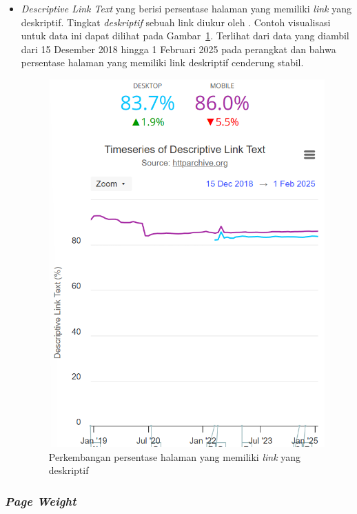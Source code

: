 \begin{itemize}
    \item \textit{Descriptive Link Text} yang berisi persentase halaman yang memiliki \textit{link} yang deskriptif. Tingkat \textit{deskriptif} sebuah link diukur oleh \light. Contoh visualisasi untuk data ini dapat dilihat pada Gambar~\ref{fig:disclink}. Terlihat dari data yang diambil dari 15 Desember 2018 hingga 1 Februari 2025 pada perangkat \desktop dan \mobile bahwa persentase halaman yang memiliki link deskriptif cenderung stabil. 
    \begin{figure}[H]
        \centering
        \includegraphics[width=0.4\linewidth]{Gambar/Contoh Descriptive Link.png}
        \caption{Perkembangan persentase halaman yang memiliki \textit{link} yang deskriptif}
        \label{fig:disclink}
    \end{figure}
\end{itemize}

\subsubsection{\textit{Page Weight}}
\label{subsub:pageweight}

